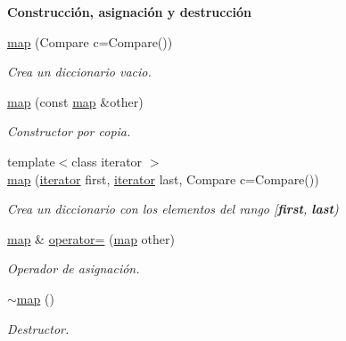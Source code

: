 \begin{Indent}{\bf \-Construcción, asignación y destrucción}\par
\begin{DoxyCompactItemize}
\item 
\hyperlink{classaed2_1_1iterator_ab55f7bc4639e905d66935b56995a5b1f_ab55f7bc4639e905d66935b56995a5b1f}{map} (\-Compare c=\-Compare())
\begin{DoxyCompactList}\small\item\em \-Crea un diccionario vacio. \end{DoxyCompactList}\item 
\hyperlink{classaed2_1_1iterator_aee42bcaf809b71168f4266e1d05971e2_aee42bcaf809b71168f4266e1d05971e2}{map} (const \hyperlink{classaed2_1_1map}{map} \&other)
\begin{DoxyCompactList}\small\item\em \-Constructor por copia. \end{DoxyCompactList}\item 
{\footnotesize template$<$class iterator $>$ }\\\hyperlink{classaed2_1_1iterator_aa44ca788a300603c5fae2d192e11f249_aa44ca788a300603c5fae2d192e11f249}{map} (\hyperlink{classaed2_1_1iterator_1_1iterator}{iterator} first, \hyperlink{classaed2_1_1iterator_1_1iterator}{iterator} last, \-Compare c=\-Compare())
\begin{DoxyCompactList}\small\item\em \-Crea un diccionario con los elementos del rango \mbox{[}{\bfseries first}, {\bfseries last}) \end{DoxyCompactList}\item 
\hyperlink{classaed2_1_1map}{map} \& \hyperlink{classaed2_1_1iterator_a7cafd02350b04f7546fa29c17168c18b_a7cafd02350b04f7546fa29c17168c18b}{operator=} (\hyperlink{classaed2_1_1map}{map} other)
\begin{DoxyCompactList}\small\item\em \-Operador de asignación. \end{DoxyCompactList}\item 
\hyperlink{classaed2_1_1iterator_a769d0ae1a1c7ed66acdd321e44fcd0e1_a769d0ae1a1c7ed66acdd321e44fcd0e1}{$\sim$map} ()
\begin{DoxyCompactList}\small\item\em \-Destructor. \end{DoxyCompactList}\end{DoxyCompactItemize}
\end{Indent}
